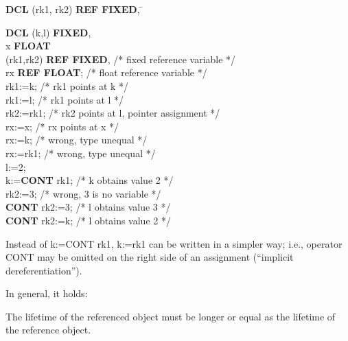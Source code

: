 \begin{tabbing}
{\bf DCL} (rk1, rk2) {\bf REF FIXED}, \= \kill

{\bf DCL} (k,l) {\bf FIXED}, \> \\
\x        x {\bf FLOAT}      \> \\
\x        (rk1,rk2) {\bf REF FIXED}, \> /* fixed reference variable */ \\
\x        rx {\bf REF FLOAT}; \> /* float reference variable */ \\
rk1:=k;   \> /* rk1 points at k */ \\
rk1:=l;   \> /* rk1 points at l */ \\
rk2:=rk1; \> /* rk2 points at l, pointer assignment */ \\
rx:=x;    \> /* rx points at x */ \\
rx:=k;    \> /* wrong, type unequal */ \\
rx:=rk1;  \> /* wrong, type unequal */ \\
l:=2;     \> \\
k:={\bf CONT} rk1; \> /* k obtains value 2 */ \\
rk2:=3;   \> /* wrong, 3 is no variable */ \\
{\bf CONT} rk2:=3; \> /* l obtains value 3 */ \\
{\bf CONT} rk2:=k; \> /* l obtains value 2 */ \\
\end{tabbing}

Instead of k:=CONT rk1, k:=rk1 can be written in a simpler way; i.e.,
operator CONT may be omitted on the right side of an assignment
(``implicit dereferentiation'').

In general, it holds:




The lifetime of the referenced object must be longer or equal as
the lifetime of the reference object.

